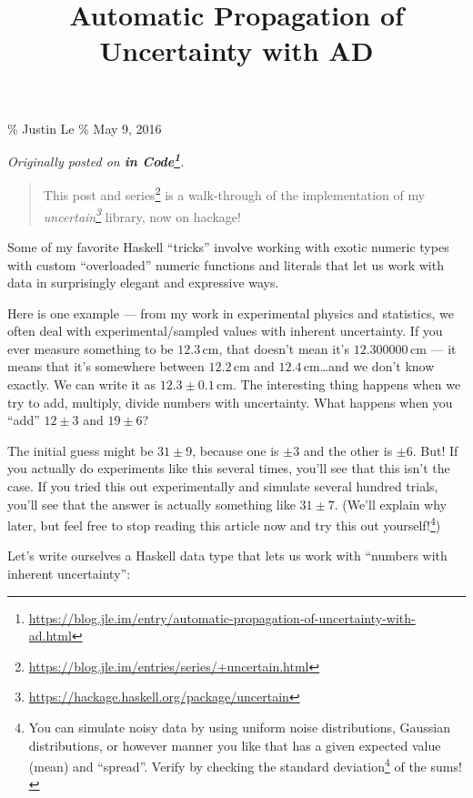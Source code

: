 \documentclass[]{article}
\title{Automatic Propagation of Uncertainty with AD}
\renewcommand{\href}[2]{#2\footnote{\url{#1}}}
\begin{document}
\maketitle

\% Justin Le \% May 9, 2016

\emph{Originally posted on
\textbf{\href{https://blog.jle.im/entry/automatic-propagation-of-uncertainty-with-ad.html}{in
Code}}.}

\begin{quote}
This post and \href{https://blog.jle.im/entries/series/+uncertain.html}{series}
is a walk-through of the implementation of my
\emph{\href{https://hackage.haskell.org/package/uncertain}{uncertain}} library,
now on hackage!
\end{quote}

Some of my favorite Haskell ``tricks'' involve working with exotic numeric types
with custom ``overloaded'' numeric functions and literals that let us work with
data in surprisingly elegant and expressive ways.

Here is one example --- from my work in experimental physics and statistics, we
often deal with experimental/sampled values with inherent uncertainty. If you
ever measure something to be \(12.3\,\mathrm{cm}\), that doesn't mean it's
\(12.300000\,\mathrm{cm}\) --- it means that it's somewhere between
\(12.2\,\mathrm{cm}\) and \(12.4\,\mathrm{cm}\)\ldots and we don't know exactly.
We can write it as \(12.3 \pm 0.1\,\mathrm{cm}\). The interesting thing happens
when we try to add, multiply, divide numbers with uncertainty. What happens when
you ``add'' \(12 \pm 3\) and \(19 \pm 6\)?

The initial guess might be \(31 \pm 9\), because one is \(\pm 3\) and the other
is \(\pm 6\). But! If you actually do experiments like this several times,
you'll see that this isn't the case. If you tried this out experimentally and
simulate several hundred trials, you'll see that the answer is actually
something like \(31 \pm 7\). (We'll explain why later, but feel free to stop
reading this article now and try this out yourself!\footnote{You can simulate
  noisy data by using uniform noise distributions, Gaussian distributions, or
  however manner you like that has a given expected value (mean) and ``spread''.
  Verify by checking the
  \href{https://en.wikipedia.org/wiki/Standard_deviation}{standard deviation} of
  the sums!})

Let's write ourselves a Haskell data type that lets us work with ``numbers with
inherent uncertainty'':
\end{document}
